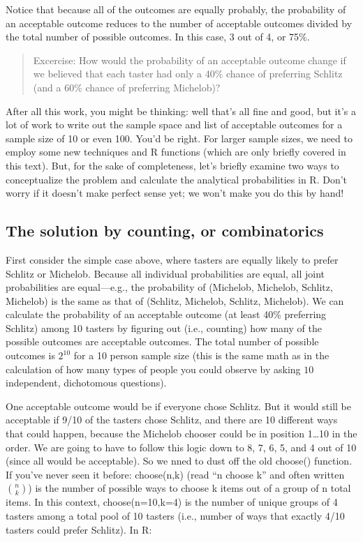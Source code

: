 \documentclass[
  openany]{book}
\begin{document}
Notice that because all of the outcomes are equally probably, the probability of an acceptable outcome reduces to the number of acceptable outcomes divided by the total number of possible outcomes. In this case, 3 out of 4, or 75\%.

\begin{quote}
Excercise: How would the probability of an acceptable outcome change if we believed that each taster had only a 40\% chance of preferring Schlitz (and a 60\% chance of preferring Michelob)?
\end{quote}

After all this work, you might be thinking: well that's all fine and good, but it's a lot of work to write out the sample space and list of acceptable outcomes for a sample size of 10 or even 100. You'd be right. For larger sample sizes, we need to employ some new techniques and R functions (which are only briefly covered in this text). But, for the sake of completeness, let's briefly examine two ways to conceptualize the problem and calculate the analytical probabilities in R. Don't worry if it doesn't make perfect sense yet; we won't make you do this by hand!

\hypertarget{the-solution-by-counting-or-combinatorics}{%
\subsection*{The solution by counting, or combinatorics}\label{the-solution-by-counting-or-combinatorics}}

First consider the simple case above, where tasters are equally likely to prefer Schlitz or Michelob. Because all individual probabilities are equal, all joint probabilities are equal---e.g., the probability of (Michelob, Michelob, Schlitz, Michelob) is the same as that of (Schlitz, Michelob, Schlitz, Michelob). We can calculate the probability of an acceptable outcome (at least 40\% preferring Schlitz) among 10 tasters by figuring out (i.e., counting) how many of the possible outcomes are acceptable outcomes. The total number of possible outcomes is \(2^{10}\) for a 10 person sample size (this is the same math as in the calculation of how many types of people you could observe by asking \(10\) independent, dichotomous questions).

One acceptable outcome would be if everyone chose Schlitz. But it would still be acceptable if 9/10 of the tasters chose Schlitz, and there are 10 different ways that could happen, because the Michelob chooser could be in position 1\ldots10 in the order. We are going to have to follow this logic down to 8, 7, 6, 5, and 4 out of 10 (since all would be acceptable). So we nned to dust off the old choose() function. If you've never seen it before: choose(n,k) (read ``n choose k'' and often written \(n\choose{k}\)) is the number of possible ways to choose k items out of a group of n total items. In this context, choose(n=10,k=4) is the number of unique groups of 4 tasters among a total pool of 10 tasters (i.e., number of ways that exactly 4/10 tasters could prefer Schlitz). In R:
\end{document}
